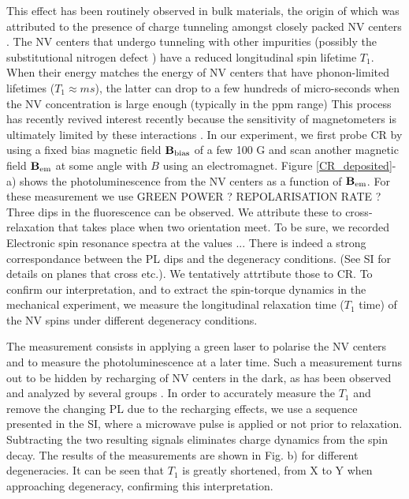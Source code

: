 \documentclass[preprintnumbers,amsmath,amssymb,superscriptaddress,twocolumn,showpacs]{revtex4-1}
\begin{document}
This effect has been routinely observed in bulk materials, the origin of which was attributed to the presence of charge tunneling amongst closely packed NV centers \cite{choi_depolarization_2017}. The NV centers that undergo tunneling with other impurities (possibly the substitutional nitrogen defect \cite{Manson}) have a reduced longitudinal spin lifetime $T_1$. When their energy matches the energy of NV centers that have phonon-limited lifetimes ($T_1\approx ms$), the latter can drop 
to a few hundreds of micro-seconds \cite{Jarmola} when the NV concentration is large enough (typically in the ppm range)
This process has recently revived interest recently because the sensitivity of magnetometers is ultimately limited by these interactions \cite{Zhou}. 
In our experiment, we first probe CR by using a fixed bias magnetic field $\bf B_{\rm bias}$ of a few 100 G and scan another magnetic field $\bf B_{\rm em}$ at some angle with $B$ using an electromagnet. 
Figure \ref{CR_deposited}-a) shows the photoluminescence from the NV centers as a function of $\bf B_{\rm em}$. 
For these measurement we use GREEN POWER ? REPOLARISATION RATE ? 
Three dips in the fluorescence can be observed. 
We attribute these to cross-relaxation that takes place when two orientation meet. To be sure, we recorded Electronic spin resonance spectra at the values ...
There is indeed a strong correspondance between the PL dips and the degeneracy conditions. 
(See SI for details on planes that cross etc.). 
We tentatively attrtibute those to CR. 
To confirm our interpretation, and to extract the spin-torque dynamics in the mechanical experiment, we measure the longitudinal relaxation time ($T_1$ time) of the NV spins under different degeneracy conditions.

The measurement consists in applying a green laser to polarise the NV centers and to measure the photoluminescence at a later time. 
Such a measurement turns out to be hidden by recharging of NV centers in the dark, as has been observed and analyzed by several groups \cite{choi_depolarization_2017, mrozek_longitudinal_2015, giri_selective_2019, giri_coupled_2018}.
In order to accurately measure the $T_1$ and remove the changing PL due to the recharging effects, we use a sequence presented in the SI, where a microwave pulse is applied or not prior to relaxation. Subtracting the two resulting signals eliminates charge dynamics from the spin decay.
The results of the measurements are shown in Fig. \label{CR_deposited}b) for different degeneracies. 
It can be seen that $T_1$ is greatly shortened, from X to Y when approaching degeneracy, confirming this interpretation.
\end{document}
